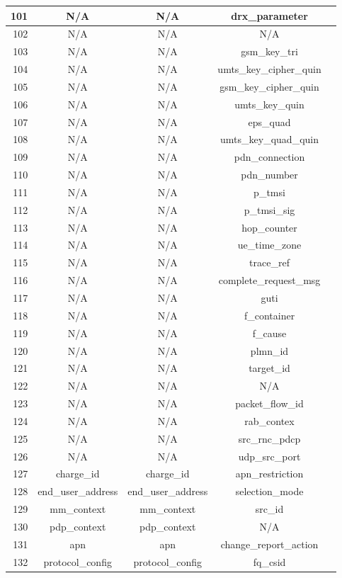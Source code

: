 \documentclass[english]{report}
\begin{document}
\begin{itemize}
\begin{longtable}{|r|c|c|c|p{13.5cm}|}
\hline
101 & N/A & N/A & drx\_parameter\\
\hline
102 & N/A & N/A & N/A\\
\hline
103 & N/A & N/A & gsm\_key\_tri\\
\hline
104 & N/A & N/A & umts\_key\_cipher\_quin\\
\hline
105 & N/A & N/A & gsm\_key\_cipher\_quin\\
\hline
106 & N/A & N/A & umts\_key\_quin\\
\hline
107 & N/A & N/A & eps\_quad\\
\hline
108 & N/A & N/A & umts\_key\_quad\_quin\\
\hline
109 & N/A & N/A & pdn\_connection\\
\hline
110 & N/A & N/A & pdn\_number\\
\hline
111 & N/A & N/A & p\_tmsi\\
\hline
112 & N/A & N/A & p\_tmsi\_sig\\
\hline
113 & N/A & N/A & hop\_counter\\
\hline
114 & N/A & N/A & ue\_time\_zone\\
\hline
115 & N/A & N/A & trace\_ref\\
\hline
116 & N/A & N/A & complete\_request\_msg\\
\hline
117 & N/A & N/A & guti\\
\hline
118 & N/A & N/A & f\_container\\
\hline
119 & N/A & N/A & f\_cause\\
\hline
120 & N/A & N/A & plmn\_id\\
\hline
121 & N/A & N/A & target\_id\\
\hline
122 & N/A & N/A & N/A\\
\hline
123 & N/A & N/A & packet\_flow\_id\\
\hline
124 & N/A & N/A & rab\_contex\\
\hline
125 & N/A & N/A & src\_rnc\_pdcp\\
\hline
126 & N/A & N/A & udp\_src\_port\\
\hline
127 & charge\_id & charge\_id & apn\_restriction\\
\hline
128 & end\_user\_address & end\_user\_address & selection\_mode\\
\hline
129 & mm\_context & mm\_context & src\_id\\
\hline
130 & pdp\_context & pdp\_context & N/A\\
\hline
131 & apn & apn & change\_report\_action\\
\hline
132 & protocol\_config & protocol\_config & fq\_csid\\

\end{longtable}
\end{itemize}
\end{document}
